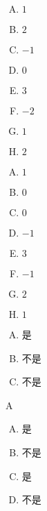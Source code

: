 {{        %
        \begin{practices}
            \begin{enumerate}[A.]
                \item $1$
                \item $2$
                \item $-1$
                \item $0$
                \item $3$
                \item $-2$
                \item $1$
                \item $2$
            \end{enumerate}
        \end{practices}

        \begin{practices}
            \begin{enumerate}[A.]
                \item $1$
                \item $0$
                \item $0$
                \item $-1$
                \item $3$
                \item $-1$
                \item $2$
                \item $1$
            \end{enumerate}
        \end{practices}

        \begin{practices}
            \begin{enumerate}[A.]
                \item 是
                \item 不是
                \item 不是
            \end{enumerate}
        \end{practices}

        \begin{practices}
            A
        \end{practices}

        \begin{practices}
            \begin{enumerate}[A.]
                \item 是
                \item 不是
                \item 是
                \item 不是
            \end{enumerate}
        \end{practices}

}}
